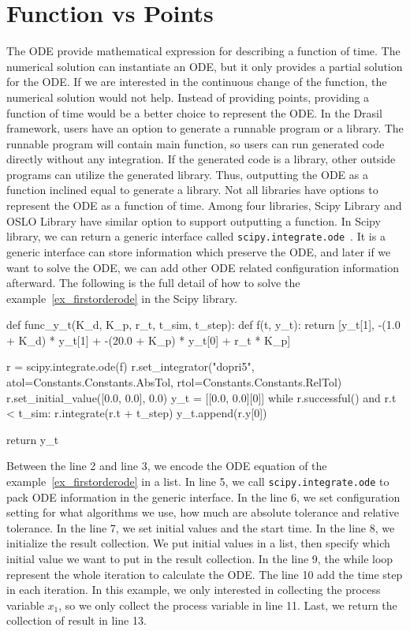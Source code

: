 \section{Function vs Points}
The ODE provide mathematical expression for describing a function of time. The numerical solution can instantiate an ODE, but it only provides a partial solution for the ODE. If we are interested in the continuous change of the function, the numerical solution would not help. Instead of providing points, providing a function of time would be a better choice to represent the ODE. In the Drasil framework, users have an option to generate a runnable program or a library. The runnable program will contain main function, so users can run generated code directly without any integration. If the generated code is a library, other outside programs can utilize the generated library. Thus, outputting the ODE as a function inclined equal to generate a library. Not all libraries have options to represent the ODE as a function of time. Among four libraries, Scipy Library and OSLO Library have similar option to support outputting a function. In Scipy library, we can return a generic interface called \verb|scipy.integrate.ode|~\citep{scipyfun}. It is a generic interface can store information which preserve the ODE, and later if we want to solve the ODE, we can add other ODE related configuration information afterward. The following is the full detail of how to solve the example~\ref{ex_firstorderode} in the Scipy library.

\begin{listing}[ht]
\begin{python1}
def func_y_t(K_d, K_p, r_t, t_sim, t_step):
    def f(t, y_t):
        return [y_t[1], -(1.0 + K_d) * y_t[1] + -(20.0 + K_p) * y_t[0] + r_t * K_p]
    
    r = scipy.integrate.ode(f)
    r.set_integrator("dopri5", atol=Constants.Constants.AbsTol, rtol=Constants.Constants.RelTol)
    r.set_initial_value([0.0, 0.0], 0.0)
    y_t = [[0.0, 0.0][0]]
    while r.successful() and r.t < t_sim:
        r.integrate(r.t + t_step)
        y_t.append(r.y[0])
    
    return y_t
\end{python1}
\label{code_pythonscipy}
\end{listing}

Between the line 2 and line 3, we encode the ODE equation of the example~\ref{ex_firstorderode} in a list. In line 5, we call \verb|scipy.integrate.ode| to pack ODE information in the generic interface. In the line 6, we set configuration setting for what algorithms we use, how much are absolute tolerance and relative tolerance. In the line 7, we set initial values and the start time. In the line 8, we initialize the result collection. We put initial values in a list, then specify which initial value we want to put in the result collection. In the line 9, the while loop represent the whole iteration to calculate the ODE. The line 10 add the time step in each iteration. In this example, we only interested in collecting the process variable $x_1$, so we only collect the process variable in line 11. Last, we return the collection of result in line 13.

